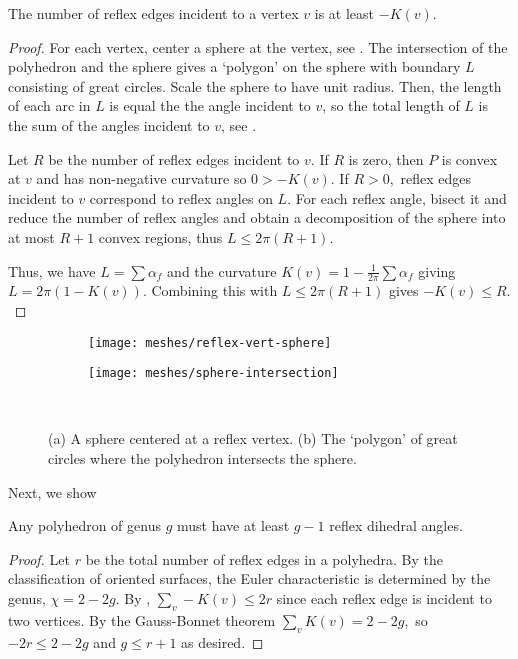 \begin{lemma}\label{lem:reflex-edge}
The number of reflex edges  incident to a vertex $v$  is at least $-K(v).$
\end{lemma}

\begin{proof}

For each vertex, center a sphere at the vertex,
see .
The intersection of the polyhedron and the sphere
gives a `polygon' on the sphere with boundary $L$ consisting of great
circles. 
Scale the sphere to have unit radius. Then, the length of each arc
in $L$ is equal the the angle incident to $v$, so the total length of $L$ is
the sum of the angles incident to $v$, see .

Let $R$ be the number of reflex edges incident to $v$.
If $R$ is zero, then $P$ is convex at $v$ and has non-negative curvature
so $0>-K(v).$ If $R>0,$
reflex edges incident to $v$ correspond to reflex angles on $L$.
For each reflex angle, bisect it and reduce the 
number of reflex angles and obtain a decomposition
of the sphere into at most $R+1$ convex regions,
thus $L\leq 2\pi(R+1)$.

Thus, we have $L=\sum \alpha_f$ and the curvature 
$K(v)=1-\frac{1}{2\pi}\sum \alpha_f$ giving
$L=2\pi(1-K(v))$. Combining this with $L\leq 2\pi(R+1)$
gives $-K(v)\leq R.$


\end{proof}

\begin{figure}[htb]
        \centering
        \begin{subfigure}[b]{0.35\textwidth}
        \texttt{[image: meshes/reflex-vert-sphere]}
        \caption{}
          \label{fig:sphere-on-vert}
        \end{subfigure}
          \hspace{1cm}
         \begin{subfigure}[b]{0.2\textwidth}
        \texttt{[image: meshes/sphere-intersection]}
        \caption{}
        \label{fig:sphere}
        \end{subfigure}\\
		\caption{(a) A sphere centered at a reflex vertex. (b) The `polygon'
		of great circles where the polyhedron intersects the sphere. 
		\label{fig:sphere}}
\end{figure}


Next, we show
\begin{theorem}\label{thm:reflex}

Any polyhedron of genus $g$ must have 
at least $g-1$ reflex dihedral angles. 

\end{theorem}
\begin{proof}
Let $r$ be the total number of reflex edges in a polyhedra.
By the classification of oriented surfaces, the Euler characteristic 
 is determined by the genus, $\chi=2-2g$.
By , $\sum_v -K(v)\leq 2 r$ since each
reflex edge is incident to two vertices.
By the Gauss-Bonnet theorem $\sum_vK(v)= 2-2g,$
so $-2r\leq 2-2g$ and $g\leq r+1$ as desired.

\end{proof}

